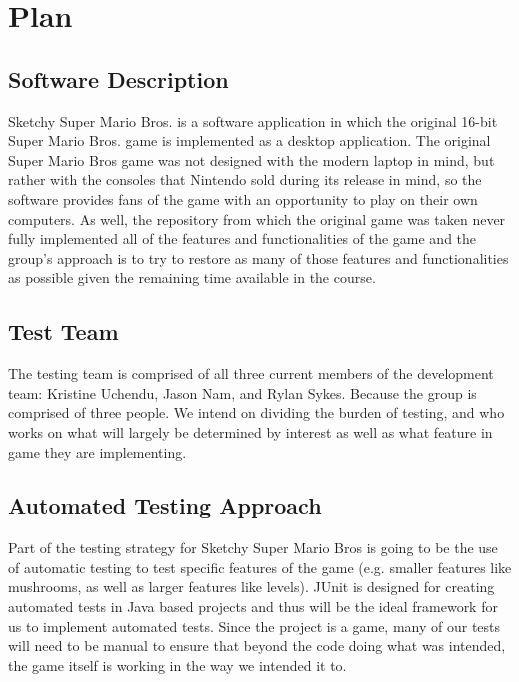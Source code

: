 \documentclass[12pt, titlepage]{article}
\begin{document}
\section{Plan}

\subsection{Software Description}

Sketchy Super  Mario Bros. is a software application in which the original 16-bit Super Mario Bros. game is implemented as a desktop application. The original Super Mario Bros game was not designed with the modern laptop in mind, but rather with the consoles that Nintendo sold during its release in mind,  so the software provides fans of the game with an opportunity to play on their own computers. As well, the repository from which the original game was taken never fully implemented all of the features and functionalities of the game and the group's approach is to try to restore as many of those features and functionalities as possible given the remaining time available in the course.

\subsection{Test Team}

The testing team is comprised of all three current members of the development team: Kristine Uchendu, Jason Nam, and Rylan Sykes. Because the group is comprised of three people. We intend on dividing the burden of testing, and who works on what will largely be determined by interest as well as what feature in game they are implementing.

\subsection{Automated Testing Approach}

Part of the testing strategy for Sketchy Super Mario Bros is going to be the use of automatic testing to test specific features of the game (e.g. smaller features like mushrooms, as well as larger features like levels). JUnit is designed for creating automated tests in Java based projects and thus will be the ideal framework for us to implement automated tests. Since the project is a game, many of our tests will need to be manual to ensure that beyond the code doing what was intended, the game itself is working in the way we intended it to.
\end{document}
